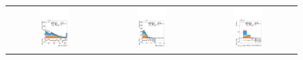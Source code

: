 \begin{figure}[htbp]
  \centering
  \setlength{\tabcolsep}{1.5pt}
  \renewcommand{\arraystretch}{1.0}

  \begin{tabular}{@{}c c c@{}}
    \includegraphics[width=0.33\textwidth]{images/plots_modelling_run2_run3_variables/run_2_tth/plot_bjet_0_pt_hh_tth_15_16_17_18.pdf} &
    \includegraphics[width=0.33\textwidth]{images/plots_modelling_run2_run3_variables/run_2_tth/plot_dEta_bH_max_hh_tth_15_16_17_18.pdf} &
    \includegraphics[width=0.33\textwidth]{images/plots_modelling_run2_run3_variables/run_2_tth/plot_n_bjets_GN2v01_FixedCutBEff_70_hh_tth_15_16_17_18.pdf}
    \\[4pt]

\end{tabular}
\end{figure}
